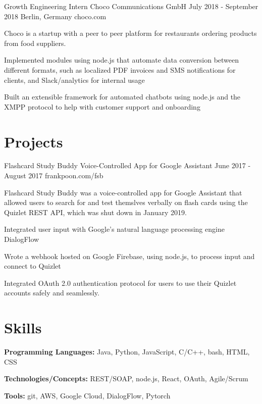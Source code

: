 \documentclass{resume}
\begin{document}
\job
{Growth Engineering Intern}
{Choco Communications GmbH}
{July 2018 - September 2018}
{Berlin, Germany}
{choco.com}
{
  Choco is a startup with a peer to peer platform for restaurants ordering 
  products from food suppliers.
  \begin{overview}
    \item Implemented modules using node.js that automate data conversion between 
          different formats, such as localized PDF invoices and SMS 
          notifications for clients, and Slack/analytics for internal usage
    \item Built an extensible framework for automated chatbots using node.js 
          and the XMPP protocol to help with customer support and onboarding
  \end{overview}
}

\section{Projects}

\project
{Flashcard Study Buddy \blt Voice-Controlled App for Google Assistant}
{June 2017 - August 2017}
{frankpoon.com/fsb}
{
  Flashcard Study Buddy was a voice-controlled app for Google Assistant that 
  allowed users to search for and test themslves verbally on flash cards using 
  the Quizlet REST API, which was shut down in January 2019.
  \begin{overview}
    \item Integrated user input with Google's natural language processing engine 
          DialogFlow
    \item Wrote a webhook hosted on Google Firebase, using node.js, to process 
          input and connect to Quizlet
    \item Integrated OAuth 2.0 authentication protocol for users to use their 
          Quizlet accounts safely and seamlessly.
  \end{overview}
}

\section{Skills}
\textbf{Programming Languages:} Java, Python, JavaScript, C/C++, bash, HTML, CSS

\textbf{Technologies/Concepts:} REST/SOAP, node.js, React, OAuth, Agile/Scrum

\textbf{Tools:} git, AWS, Google Cloud, DialogFlow, Pytorch
\end{document}
